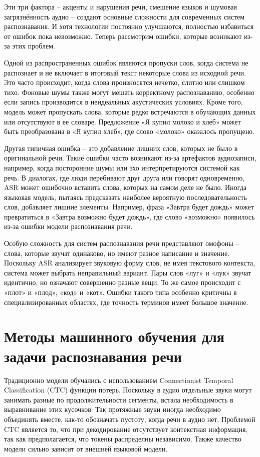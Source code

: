 Эти три фактора -- акценты и нарушения речи, смешение языков и шумовая загрязнённость аудио -- создают основные сложности для современных систем распознавания.
И хотя технологии постоянно улучшаются, полностью избавиться от ошибок пока невозможно.
Теперь рассмотрим ошибки, которые возникают из-за этих проблем.

Одной из распространенных ошибок являются пропуски слов, когда система не распознает и не включает в итоговый текст некоторые слова из исходной речи.
Это часто происходит, когда слова произносятся нечетко, слитно или слишком тихо.
Фоновые шумы также могут мешать корректному распознаванию, особенно если запись производится в неидеальных акустических условиях.
Кроме того, модель может пропускать слова, которые редко встречаются в обучающих данных или отсутствуют в ее словаре.
Предложение «Я купил молоко и хлеб» может быть преобразована в «Я купил хлеб», где слово «молоко» оказалось пропущено.

Другая типичная ошибка -- это добавление лишних слов, которых не было в оригинальной речи.
Такие ошибки часто возникают из-за артефактов аудиозаписи, например, когда посторонние шумы или эхо интерпретируются системой как речь.
В диалогах, где люди перебивают друг друга или говорят одновременно, ASR может ошибочно вставить слова, которых на самом деле не было.
Иногда языковая модель, пытаясь предсказать наиболее вероятную последовательность слов, добавляет лишние элементы.
Например, фраза «Завтра будет дождь» может превратиться в «Завтра возможно будет дождь», где слово «возможно» появилось из-за ошибки модели распознавания речи.

Особую сложность для систем распознавания речи представляют омофоны -- слова, которые звучат одинаково, но имеют разное написание и значение.
Поскольку ASR анализирует звуковую форму слов, не имея текстового контекста, система может выбрать неправильный вариант.
Пары слов «луг» и «лук» звучат идентично, но означают совершенно разные вещи.
То же самое происходит с «плот» и «плод», «код» и «кот».
Ошибки такого типа особенно критичны в специализированных областях, где точность терминов имеет большое значение.

\section{Методы машинного обучения для задачи распознавания речи}

Традиционно модели обучались с использованием Connectionist Temporal Classification (CTC) функции потерь.
Поскольку в аудио отдельные звуки могут занимать разные по продолжительности сегменты, встала необходимость в выравнивание этих кусочков.
Так протяжные звуки иногда необходимо объединять вместе, как-то обозначать пустоту, когда речи в аудио нет.
Проблемой CTC является то, что при декодирование отсутствует контекстная информация, так как предполагается, что токены распределны независимо.
Также качество модели сильно зависит от внешней языковой модели.

